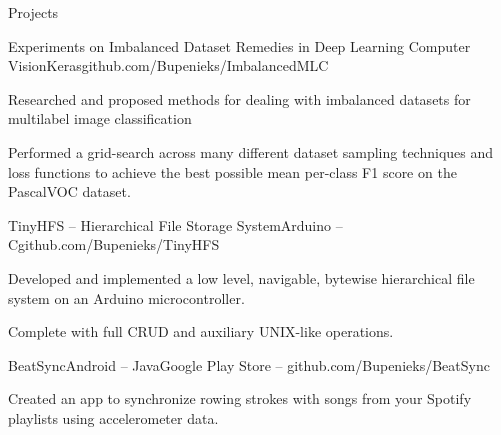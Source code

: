 \documentclass{resume} %
\begin{document}
\begin{rSection}{Projects}



\begin{rSubsection}{Experiments on Imbalanced Dataset Remedies in Deep Learning Computer Vision}{}{Keras}{github.com/Bupenieks/ImbalancedMLC}
	\item Researched and proposed methods for dealing with imbalanced datasets for multilabel image classification %
	
	\item Performed a grid-search across many different dataset sampling techniques and loss functions to achieve the best possible mean per-class F1 score on the PascalVOC dataset.
\end{rSubsection}

\begin{rSubsection}{TinyHFS -- Hierarchical File Storage System}{}{Arduino -- C}{github.com/Bupenieks/TinyHFS}

\item Developed and implemented a low level, navigable, bytewise hierarchical file system on an Arduino microcontroller.%
\item Complete with full CRUD and auxiliary UNIX-like operations.
\end{rSubsection}


\begin{rSubsection}{BeatSync}{}{Android -- Java}{Google Play Store -- github.com/Bupenieks/BeatSync}
\item Created an app to synchronize rowing strokes with songs from your Spotify playlists using accelerometer data.
\end{rSubsection}





\end{rSection}
\end{document}
